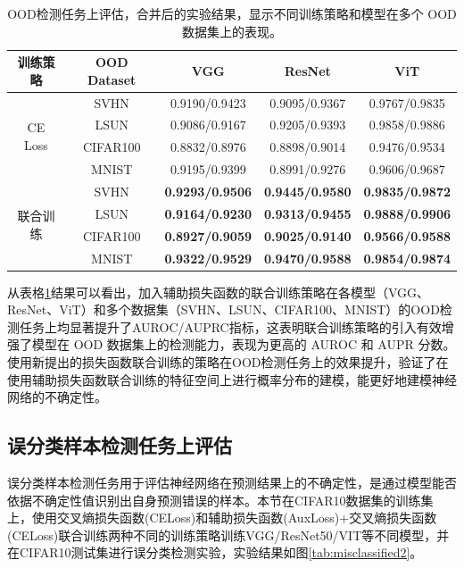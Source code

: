 \begin{table}[h]
\captionsetup{font=small, justification=centering}
\centering
\renewcommand{\arraystretch}{1.2}
\setlength{\tabcolsep}{8pt}
\begin{tabular}{c c c c c}
\hline
\textbf{训练策略} & \textbf{OOD Dataset} & \textbf{VGG} & \textbf{ResNet} & \textbf{ViT} \\ 
\hline
\multirow{4}{*}{CE Loss} 
& SVHN & 0.9190/0.9423 & 0.9095/0.9367 & 0.9767/0.9835 \\ 
& LSUN & 0.9086/0.9167 & 0.9205/0.9393 & 0.9858/0.9886 \\ 
& CIFAR100 & 0.8832/0.8976 & 0.8898/0.9014 & 0.9476/0.9534 \\ 
& MNIST & 0.9195/0.9399 & 0.8991/0.9276 & 0.9606/0.9687 \\ 
\hline
\multirow{4}{*}{联合训练} 
& SVHN & \textbf{0.9293/0.9506} & \textbf{0.9445/0.9580} & \textbf{0.9835/0.9872} \\ 
& LSUN & \textbf{0.9164/0.9230} & \textbf{0.9313/0.9455} & \textbf{0.9888/0.9906} \\ 
& CIFAR100 & \textbf{0.8927/0.9059} & \textbf{0.9025/0.9140} & \textbf{0.9566/0.9588} \\ 
& MNIST & \textbf{0.9322/0.9529} & \textbf{0.9470/0.9588} & \textbf{0.9854/0.9874} \\ 
\hline
\end{tabular}
\caption{OOD检测任务上评估，合并后的实验结果，显示不同训练策略和模型在多个 OOD 数据集上的表现。}
\label{OOD}
\end{table}


从表格\ref{OOD}结果可以看出，加入辅助损失函数的联合训练策略在各模型（VGG、ResNet、ViT）和多个数据集（SVHN、LSUN、CIFAR100、MNIST）的OOD检测任务上均显著提升了AUROC/AUPRC指标，这表明联合训练策略的引入有效增强了模型在 OOD 数据集上的检测能力，表现为更高的 AUROC 和 AUPR 分数。使用新提出的损失函数联合训练的策略在OOD检测任务上的效果提升，验证了在使用辅助损失函数联合训练的特征空间上进行概率分布的建模，能更好地建模神经网络的不确定性。

\subsection{误分类样本检测任务上评估}

误分类样本检测任务用于评估神经网络在预测结果上的不确定性，是通过模型能否依据不确定性值识别出自身预测错误的样本。本节在CIFAR10数据集的训练集上，使用交叉熵损失函数(CELoss)和辅助损失函数(AuxLoss)+交叉熵损失函数(CELoss)联合训练两种不同的训练策略训练VGG/ResNet50/VIT等不同模型，并在CIFAR10测试集进行误分类检测实验，实验结果如图\ref{tab:misclassified2}。

